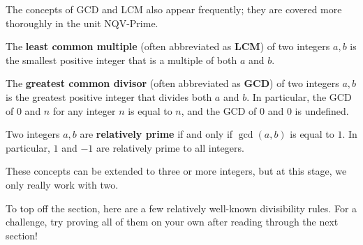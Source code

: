 \documentclass[mast]{lucky}
\begin{document}
The concepts of GCD and LCM also appear frequently; they are covered more thoroughly in the unit NQV-Prime.

\begin{defi}
The \textbf{least common multiple} (often abbreviated as \textbf{LCM}) of two integers $a,b$ is the smallest positive integer that is a multiple of both $a$ and $b$.
\end{defi}

\begin{defi}
The \textbf{greatest common divisor} (often abbreviated as \textbf{GCD}) of two integers $a,b$ is the greatest positive integer that divides both $a$ and $b$. In particular, the GCD of $0$ and $n$ for any integer $n$ is equal to $n$, and the GCD of $0$ and $0$ is undefined.
\end{defi}

\begin{defi}
Two integers $a,b$ are \textbf{relatively prime} if and only if $\gcd{(a,b)}$ is equal to $1$. In particular, $1$ and $-1$ are relatively prime to all integers.
\end{defi}

These concepts can be extended to three or more integers, but at this stage, we only really work with two.

To top off the section, here are a few relatively well-known divisibility rules. For a challenge, try proving all of them on your own after reading through the next section! 
\end{document}
